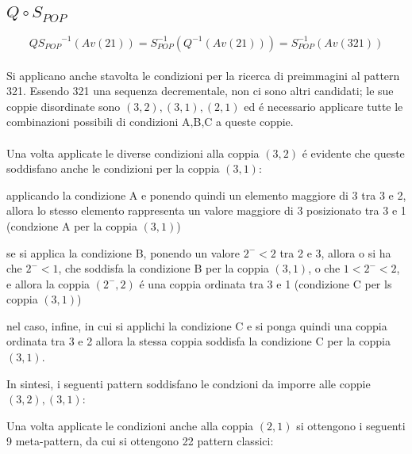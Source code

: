 \subsection*{$Q\circ{S_{POP}}$}
$$Q{S_{POP}}^{-1}(Av(21)) = S_{POP}^{-1}(Q^{-1}(Av(21))) = S_{POP}^{-1}(Av(321))$$
\\Si applicano anche stavolta le condizioni per la ricerca di preimmagini al pattern 321. Essendo 321 una sequenza decrementale, non ci sono altri candidati; le sue coppie disordinate sono $(3,2),(3,1),(2,1)$ ed \'e necessario applicare tutte le combinazioni possibili di condizioni A,B,C a queste coppie.\\\\
Una volta applicate le diverse condizioni alla coppia $(3,2)$ \'e evidente che queste soddisfano anche le condizioni per la coppia $(3,1)$:
\begin{description}
	\item applicando la condizione A e ponendo quindi un elemento maggiore di 3 tra 3 e 2, allora lo stesso elemento rappresenta un valore maggiore di 3 posizionato tra 3 e 1 (condzione A per la coppia $(3,1)$)
	\item se si applica la condizione B, ponendo un valore $2^-<2$ tra 2 e 3, allora o si ha che $2^-<1$, che soddisfa la condizione B per la coppia $(3,1)$, o che $1<2^-<2$, e allora la coppia $(2^-,2)$ \'e una coppia ordinata tra 3 e 1 (condizione C per ls coppia $(3,1)$)
	\item nel caso, infine, in cui si applichi la condizione C e si ponga quindi una coppia ordinata tra 3 e 2 allora la stessa coppia soddisfa la condizione C per la coppia $(3,1)$.
\end{description}
In sintesi, i seguenti pattern soddisfano le condzioni da imporre alle coppie $(3,2),(3,1)$:
\begin{center}
\end{center}
Una volta applicate le condizioni anche alla coppia $(2,1)$ si ottengono i seguenti 9 meta-pattern, da cui si ottengono 22 pattern classici:
\begin{center}
\end{center}
